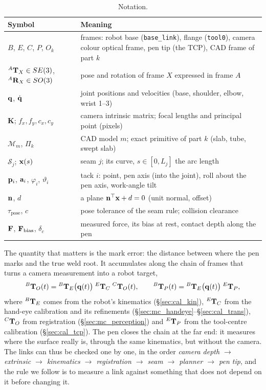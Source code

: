 \begin{table}[htbp]
\caption{Notation.}
\label{tab:notation}
\centering\small
\begin{tabular}{@{}L{0.22\textwidth}L{0.70\textwidth}@{}}
\toprule
Symbol & Meaning \\
\midrule
$B$, $E$, $C$, $P$, $O_k$ & frames: robot base (\texttt{base\_link}), flange (\texttt{tool0}), camera colour optical frame, pen tip (the TCP), CAD frame of part $k$ \\
${}^{A}\mathbf{T}_{X}\in SE(3)$, ${}^{A}\mathbf{R}_{X}\in SO(3)$ & pose and rotation of frame $X$ expressed in frame $A$ \\
$\mathbf{q}$, $\dot{\mathbf{q}}$ & joint positions and velocities (base, shoulder, elbow, wrist 1--3) \\
$\mathbf{K}$; $f_x,f_y,c_x,c_y$ & camera intrinsic matrix; focal lengths and principal point (pixels) \\
$\mathcal{M}_m$, $\Pi_k$ & CAD model $m$; exact primitive of part $k$ (slab, tube, swept slab) \\
$\mathcal{S}_j$; $\mathbf{x}(s)$ & seam $j$; its curve, $s\in[0,L_j]$ the arc length \\
$\mathbf{p}_i$, $\mathbf{a}_i$, $\varphi_i$, $\vartheta_i$ & tack $i$: point, pen axis (into the joint), roll about the pen axis, work-angle tilt \\
$\mathbf{n}$, $d$ & a plane $\mathbf{n}^{\top}\mathbf{x}+d=0$ (unit normal, offset) \\
$\tau_{\mathrm{pose}}$, $c$ & pose tolerance of the seam rule; collision clearance \\
$\mathbf{F}$, $\mathbf{F}_{\mathrm{bias}}$, $\delta_c$ & measured force, its bias at rest, contact depth along the pen \\
\bottomrule
\end{tabular}
\end{table}

The quantity that matters is the mark error: the distance between where the pen marks and the
true weld root. It accumulates along the chain of frames that turns a camera measurement into a
robot target,
\begin{equation}
{}^{B}\mathbf{T}_{O}(t) = {}^{B}\mathbf{T}_{E}\big(\mathbf{q}(t)\big)\;{}^{E}\mathbf{T}_{C}\;{}^{C}\mathbf{T}_{O}(t),
\qquad
{}^{B}\mathbf{T}_{P}(t) = {}^{B}\mathbf{T}_{E}\big(\mathbf{q}(t)\big)\;{}^{E}\mathbf{T}_{P},
\label{eq:frame_chain}
\end{equation}
where ${}^{B}\mathbf{T}_{E}$ comes from the robot's kinematics (\S\ref{sec:cal_kin}), ${}^{E}\mathbf{T}_{C}$ from the
hand-eye calibration and its refinements (\S\ref{sec:mc_handeye}--\S\ref{sec:cal_trans}),
${}^{C}\mathbf{T}_{O}$ from registration (\S\ref{sec:mc_perception}) and ${}^{E}\mathbf{T}_{P}$ from the tool-centre
calibration (\S\ref{sec:cal_tcp}). The pen closes the chain at the far end: it measures where
the surface really is, through the same kinematics, but without the camera. The links can thus
be checked one by one, in the order
\emph{camera depth $\to$ extrinsic $\to$ kinematics $\to$ registration $\to$ seam $\to$ planner
$\to$ pen tip}, and the rule we follow is to measure a link against something that does not
depend on it before changing it.

